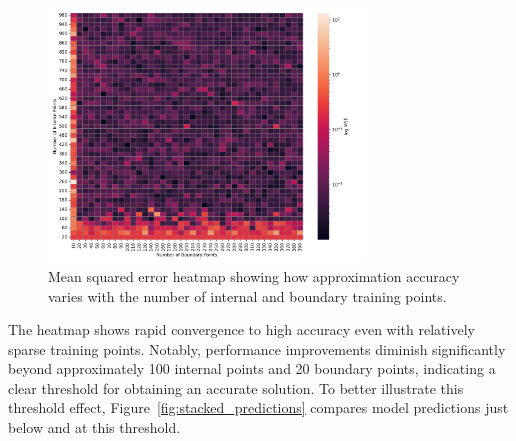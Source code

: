 \begin{figure}[t]
    \centering
    \includegraphics[width=0.75\textwidth]{graphics/pde_uniform_sampling_heatmap.png}
    \caption{Mean squared error heatmap showing how approximation accuracy varies with the number of internal and boundary training points.}
    \label{fig:training_point_comparison}
\end{figure}

The heatmap shows rapid convergence to high accuracy even with relatively sparse training points. 
Notably, performance improvements diminish significantly beyond approximately 100 internal points and
20 boundary points, indicating a clear threshold for obtaining an accurate solution. To better 
illustrate this threshold effect, Figure~\ref{fig:stacked_predictions} compares model predictions 
just below and at this threshold.

